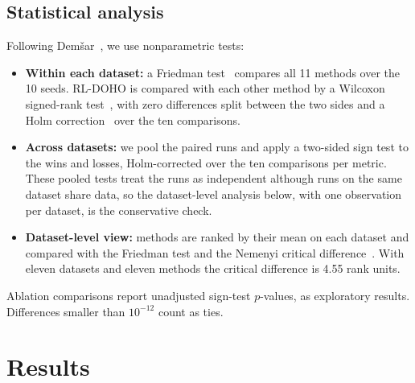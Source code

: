\documentclass[journal]{IEEEtran}
\begin{document}
\subsection{Statistical analysis}
Following Dem\v{s}ar~\cite{demsar2006}, we use nonparametric tests:
\begin{itemize}
\item \textbf{Within each dataset:} a Friedman test~\cite{friedman1937} compares all 11 methods over the 10 seeds. RL-DOHO is compared with each other method by a Wilcoxon signed-rank test~\cite{wilcoxon1945}, with zero differences split between the two sides and a Holm correction~\cite{holm1979} over the ten comparisons.
\item \textbf{Across datasets:} we pool the paired runs and apply a two-sided sign test to the wins and losses, Holm-corrected over the ten comparisons per metric. These pooled tests treat the runs as independent although runs on the same dataset share data, so the dataset-level analysis below, with one observation per dataset, is the conservative check.
\item \textbf{Dataset-level view:} methods are ranked by their mean on each dataset and compared with the Friedman test and the Nemenyi critical difference~\cite{nemenyi1963}. With eleven datasets and eleven methods the critical difference is 4.55 rank units.
\end{itemize}
Ablation comparisons report unadjusted sign-test $p$-values, as exploratory results. Differences smaller than $10^{-12}$ count as ties.

\section{Results}\label{sec:results}
\end{document}

